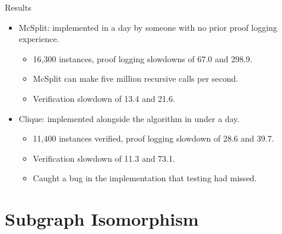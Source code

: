 \documentclass{beamer}
\begin{document}
\begin{frame}{Results}
    \begin{itemize}
        \item McSplit: implemented in a day by someone with no prior proof logging experience.
            \begin{itemize}
                \item 16,300 instances, proof logging slowdowns of 67.0 and 298.9.
                \item McSplit can make five million recursive calls per second.
                \item Verification slowdown of 13.4 and 21.6.
            \end{itemize}
        \item Clique: implemented alongside the algorithm in under a day.
            \begin{itemize}
                \item 11,400 instances verified, proof logging slowdown of 28.6 and 39.7.
                \item Verification slowdown of 11.3 and 73.1.
                \item Caught a bug in the implementation that testing had missed.
            \end{itemize}
    \end{itemize}
\end{frame}

\section{Subgraph Isomorphism}
\end{document}
